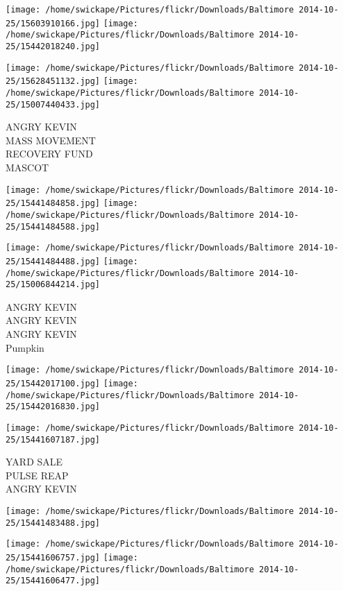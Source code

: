 \documentclass[10pt,letterpaper]{article}
\begin{document}
\texttt{[image: /home/swickape/Pictures/flickr/Downloads/Baltimore 2014-10-25/15603910166.jpg]}
\texttt{[image: /home/swickape/Pictures/flickr/Downloads/Baltimore 2014-10-25/15442018240.jpg]}

\texttt{[image: /home/swickape/Pictures/flickr/Downloads/Baltimore 2014-10-25/15628451132.jpg]}
\texttt{[image: /home/swickape/Pictures/flickr/Downloads/Baltimore 2014-10-25/15007440433.jpg]}

ANGRY KEVIN\\
MASS MOVEMENT\\
RECOVERY FUND\\
MASCOT
\pagebreak

\texttt{[image: /home/swickape/Pictures/flickr/Downloads/Baltimore 2014-10-25/15441484858.jpg]}
\texttt{[image: /home/swickape/Pictures/flickr/Downloads/Baltimore 2014-10-25/15441484588.jpg]}

\texttt{[image: /home/swickape/Pictures/flickr/Downloads/Baltimore 2014-10-25/15441484488.jpg]}
\texttt{[image: /home/swickape/Pictures/flickr/Downloads/Baltimore 2014-10-25/15006844214.jpg]}

ANGRY KEVIN\\
ANGRY KEVIN\\
ANGRY KEVIN\\
Pumpkin
\pagebreak

\texttt{[image: /home/swickape/Pictures/flickr/Downloads/Baltimore 2014-10-25/15442017100.jpg]}
\texttt{[image: /home/swickape/Pictures/flickr/Downloads/Baltimore 2014-10-25/15442016830.jpg]}

\vspace{0.25in}
\texttt{[image: /home/swickape/Pictures/flickr/Downloads/Baltimore 2014-10-25/15441607187.jpg]}

YARD SALE\\
PULSE REAP\\
ANGRY KEVIN
\pagebreak

\texttt{[image: /home/swickape/Pictures/flickr/Downloads/Baltimore 2014-10-25/15441483488.jpg]}

\vspace{0.25in}
\texttt{[image: /home/swickape/Pictures/flickr/Downloads/Baltimore 2014-10-25/15441606757.jpg]}
\texttt{[image: /home/swickape/Pictures/flickr/Downloads/Baltimore 2014-10-25/15441606477.jpg]}
\end{document}
